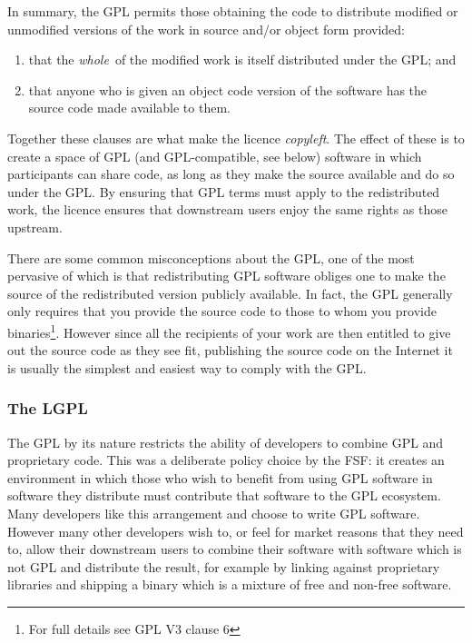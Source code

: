 \documentclass[a4paper,12pt]{article}
\begin{document}
In summary, the GPL permits those obtaining the code to distribute modified
or unmodified versions of the work in source and/or object form provided:
\begin{enumerate}
\item that the \emph{whole}\ of the modified work is itself distributed
  under the GPL; and
\item that anyone who is given an object code version of the software has
  the source code made available to them.
\end{enumerate}
Together these clauses are what make the licence \emph{copyleft}. The effect
of these is to create a space of GPL (and GPL-compatible, see below)
software in which participants can share code, as long as they make the
source available and do so under the GPL. By ensuring that GPL terms must
apply to the redistributed work, the licence ensures that downstream users
enjoy the same rights as those upstream.

There are some common misconceptions about the GPL, one of the most
pervasive of which is that redistributing GPL software obliges one to make
the source of the redistributed version publicly available. In fact, the GPL
generally only requires that you provide the source code to those to whom
you provide binaries\footnote{For full details see GPL V3 clause
  6}. However since all the recipients of your work are then entitled to
give out the source code as they see fit, publishing the source code on the
Internet it is usually the simplest and easiest way to comply with the GPL.

\subsubsection{The LGPL}

The GPL by its nature restricts the ability of developers to combine GPL and
proprietary code. This was a deliberate policy choice by the FSF: it creates
an environment in which those who wish to benefit from using GPL software
in software they distribute must contribute that software to the GPL
ecosystem. Many developers like this arrangement and choose to write GPL
software. However many other developers wish to, or feel for market reasons
that they need to, allow their downstream users to combine their software
with software which is not GPL and distribute the result, for example by
linking against proprietary libraries and shipping a binary which is a
mixture of free and non-free software.
\end{document}
